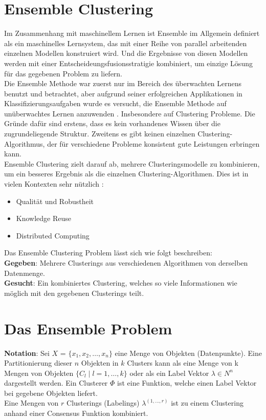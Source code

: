 \documentclass[runningheads]{llncs}
\begin{document}
\section{Ensemble Clustering}
Im Zusammenhang mit maschinellem Lernen ist Ensemble im Allgemein definiert als ein maschinelles Lernsystem, das mit einer Reihe von parallel arbeitenden einzelnen Modellen konstruiert wird. Und die Ergebnisse von diesen Modellen werden mit einer Entscheideungsfusionsstratigie kombiniert, um einzige Lösung für das gegebenen Problem zu liefern.\\[4pt]
 Die Ensemble Methode war zuerst nur im Bereich des überwachten Lernens benutzt und betrachtet, aber aufgrund seiner erfolgreichen Applikationen in Klassifizierungsaufgaben wurde es versucht, die Ensemble Methode auf unüberwachtes Lernen anzuwenden \cite{alqurashi2019clustering}. Insbesondere auf Clustering Probleme. Die Gründe dafür sind erstens, dass es kein vorhandenes Wissen über die zugrundeliegende Struktur. Zweitens es gibt keinen einzelnen Clustering-Algorithmus, der für verschiedene Probleme konsistent gute Leistungen erbringen kann.\\[4pt]
 Ensemble Clustering zielt darauf ab, mehrere Clusteringsmodelle zu kombinieren, um ein besseres Ergebnis als die einzelnen Clustering-Algorithmen. Dies ist in vielen Kontexten sehr nützlich \cite{strehl2002cluster}: 
\begin{itemize}
	\item Qualität und Robustheit  
	\item Knowledge Reuse 
	\item Distributed Computing     
\end{itemize}
Das Ensemble Clustering Problem lässt sich wie folgt beschreiben:\\[4pt]
\textbf{Gegeben}: Mehrere Clusterings aus verschiedenen Algorithmen von derselben Datenmenge.\\[4pt]
\textbf{Gesucht}: Ein kombiniertes Clustering, welches so viele Informationen wie möglich mit den gegebenen Clusterings teilt. 


\section{Das Ensemble Problem}
\textbf{Notation}: Sei $X$ = $\{x_1, x_2, \ldots, x_n\}$ eine Menge von Objekten (Datenpunkte). Eine Partitionierung dieser $n$ Objekten in $k$ Clusters kann als eine Menge von k Mengen von Objekten $\{C_{l} \mid l = 1, \ldots, k\}$ oder als ein Label Vektor $\lambda \in {N}^{n}$ dargestellt werden. Ein Clusterer $\Phi$ ist eine Funktion, welche einen Label Vektor bei gegebene Objekten liefert.\\[4pt] 
Eine Mengen von $r$ Clusterings (Labelings) $\lambda^{(1, \dots, r)}$ ist zu einem Clustering anhand einer Consensus Funktion kombiniert. 
\end{document}
